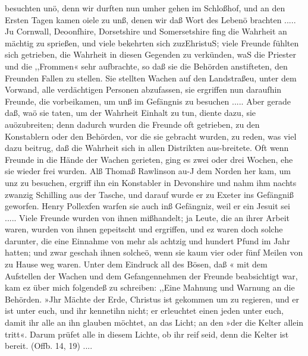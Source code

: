 besuchten unö, denn wir durften nun umher gehen im Schloßhof,
und an den Ersten Tagen kamen oiele zu unß, denen wir daß
Wort des Lebenö brachten .....
Ju Cornwall, Deoonfhire, Dorsetshire und Somersetshire
fing die Wahrheit an mächtig zu sprießen, und viele bekehrten sich
zuzEhristuS; viele Freunde fühlten sich getrieben, die Wahrheit
in diesen Gegenden zu verkünden, waS die Priester und die
,,Frommen« sehr aufbrachte, so daß sie die Behörden anstifteten,
den Freunden Fallen zu stellen. Sie stellten Wachen auf den
Landstraßeu, unter dem Vorwand, alle verdächtigen Personen
abzufassen, sie ergriffen nun daraufhin Freunde, die vorbeikamen,
um unß im Gefängnis zu besuchen ..... Aber gerade daß,
waö sie taten, um der Wahrheit Einhalt zu tun, diente dazu, sie
auözubreiten; denn dadurch wurden die Freunde oft getrieben, zu
den Konstablern oder den Behörden, vor die sie gebracht wurden,
zu reden, was viel dazu beitrug, daß die Wahrheit sich in allen
Distrikten aus-breitete. Oft wenn Freunde in die Hände der
Wachen gerieten, ging es zwei oder drei Wochen, ehe sie wieder
frei wurden.
Alß Thomaß Rawlinson au-J dem Norden her kam, um unz
zu besuchen, ergriff ihn ein Konstabler in Devonshire und nahm
ihm nachts zwanzig Schilling aus der Tasche, und darauf wurde
er zu Exeter ins Gefängniß geworfen. Henry Pollexfen warfen
sie auch inß Gefängniz, weil er ein Jesuit sei ..... Viele
Freunde wurden von ihnen mißhandelt; ja Leute, die an ihrer
Arbeit waren, wurden von ihnen gepeitscht und ergriffen, und
ez waren doch solche darunter, die eine Einnahme von mehr
als achtzig und hundert Pfund im Jahr hatten; und zwar
geschah ihnen solcheö, wenn sie kaum vier oder fünf Meilen von
zu Hause weg waren. Unter dem Eindruck all des Bösen, daß «
mit dem Aufstellen der Wachen und dem Gefangennehmen der
Freunde beabsichtigt war, kam ez über mich folgendeß zu schreiben:
,,Eine Mahnung und Warnung an die Behörden.
»Jhr Mächte der Erde, Christus ist gekommen um zu regieren,
und er ist unter euch, und ihr kennetihn nicht; er erleuchtet einen
jeden unter euch, damit ihr alle an ihn glauben möchtet, an
das Licht; an den »der die Kelter allein tritt«. Darum prüfet
alle in diesem Lichte, ob ihr reif seid, denn die Kelter ist bereit.
(Offb. 14, 19) ....


